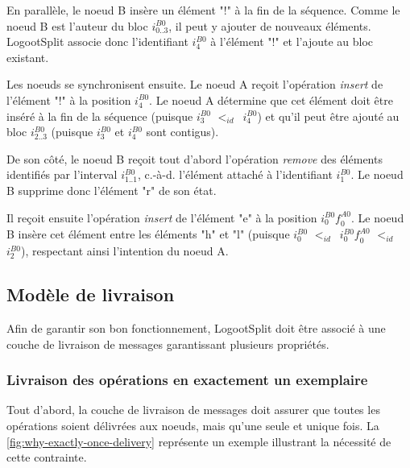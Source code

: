 \documentclass[12pt]{thesul}
\newcommand{\ie}{c.-à-d. }
\newcommand{\trm}[1]{\mathit{#1}}
\newcommand{\id}[3]{$\trm{#1}^{\trm{#2}}_{\trm{#3}}$}
\newcommand{\lid}{$<_{id}$~}
\begin{document}
En parallèle, le noeud B insère un élément "!" à la fin de la séquence.
Comme le noeud B est l'auteur du bloc \id{i}{B0}{0..3}, il peut y ajouter de nouveaux éléments.
LogootSplit associe donc l'identifiant \id{i}{B0}{4} à l'élément "!" et l'ajoute au bloc existant.

Les noeuds se synchronisent ensuite.
Le noeud A reçoit l'opération \emph{insert} de l'élément "!" à la position \id{i}{B0}{4}.
Le noeud A détermine que cet élément doit être inséré à la fin de la séquence (puisque \id{i}{B0}{3} \lid \id{i}{B0}{4}) et qu'il peut être ajouté au bloc \id{i}{B0}{2..3} (puisque \id{i}{B0}{3} et \id{i}{B0}{4} sont contigus).

De son côté, le noeud B reçoit tout d'abord l'opération \emph{remove} des éléments identifiés par l'interval \id{i}{B0}{1..1}, \ie l'élément attaché à l'identifiant \id{i}{B0}{1}.
Le noeud B supprime donc l'élément "r" de son état.

Il reçoit ensuite l'opération \emph{insert} de l'élément "e" à la position \id{i}{B0}{0}\id{f}{A0}{0}.
Le noeud B insère cet élément entre les éléments "h" et "l" (puisque \id{i}{B0}{0} \lid \id{i}{B0}{0}\id{f}{A0}{0} \lid \id{i}{B0}{2}), respectant ainsi l'intention du noeud A.


\subsection{Modèle de livraison}

\label{sec:logootsplit-delivery-model}

Afin de garantir son bon fonctionnement, LogootSplit doit être associé à une couche de livraison de messages garantissant plusieurs propriétés.

\subsubsection{Livraison des opérations en exactement un exemplaire}

Tout d'abord, la couche de livraison de messages doit assurer que toutes les opérations soient délivrées aux noeuds, mais qu'une seule et unique fois.
La \autoref{fig:why-exactly-once-delivery} représente un exemple illustrant la nécessité de cette contrainte.
\end{document}
